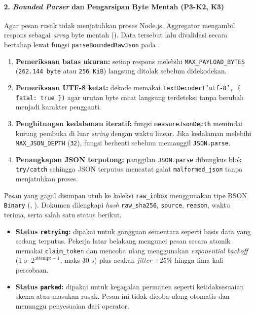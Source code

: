 \paragraph*{2. \textit{Bounded Parser} dan Pengarsipan Byte Mentah (P3-K2, K3)}
Agar pesan rusak tidak menjatuhkan proses Node.js, Aggregator mengambil respons sebagai \textit{array} byte mentah (). Data tersebut lalu divalidasi secara bertahap lewat fungsi \texttt{parseBoundedRawJson} pada .

\begin{enumerate}
  \item \textbf{Pemeriksaan batas ukuran:} setiap respons melebihi \texttt{MAX\_PAYLOAD\_BYTES} (\texttt{262.144 byte} atau \texttt{256 KiB}) langsung ditolak sebelum didekodekan.
  \item \textbf{Pemeriksaan UTF-8 ketat:} dekode memakai \texttt{TextDecoder('utf-8', \{ fatal: true \})} agar urutan byte cacat langsung terdeteksi tanpa berubah menjadi karakter pengganti.
  \item \textbf{Penghitungan kedalaman iteratif:} fungsi \texttt{measureJsonDepth} memindai kurung pembuka di luar \textit{string} dengan waktu linear. Jika kedalaman melebihi \texttt{MAX\_JSON\_DEPTH} (\texttt{32}), fungsi berhenti sebelum memanggil \texttt{JSON.parse}.
  \item \textbf{Penangkapan JSON terpotong:} panggilan \texttt{JSON.parse} dibungkus blok \texttt{try/catch} sehingga JSON terputus mencatat galat \texttt{malformed\_json} tanpa menjatuhkan proses.
\end{enumerate}

Pesan yang gagal disimpan utuh ke koleksi \texttt{raw\_inbox} menggunakan tipe BSON \texttt{Binary} (, ). Dokumen dilengkapi \textit{hash} \texttt{raw\_sha256}, \texttt{source}, \texttt{reason}, waktu terima, serta salah satu status berikut.

\begin{itemize}
  \item \textbf{Status \texttt{retrying}:} dipakai untuk gangguan sementara seperti basis data yang sedang terputus. Pekerja latar belakang mengunci pesan secara atomik memakai \texttt{claim\_token} dan mencoba ulang menggunakan \textit{exponential backoff} ($1\text{ s} \cdot 2^{\text{attempt}-1}$, maks $30\text{ s}$) plus acakan \textit{jitter} $\pm 25\%$ hingga lima kali percobaan.
  \item \textbf{Status \texttt{parked}:} dipakai untuk kegagalan permanen seperti ketidaksesuaian skema atau masukan rusak. Pesan ini tidak dicoba ulang otomatis dan menunggu penyesuaian dari operator.
\end{itemize}


